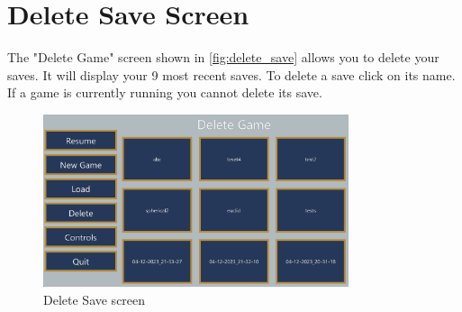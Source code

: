 \section{Delete Save Screen} \label{delete_save_screen}
The "Delete Game" screen shown in \autoref{fig:delete_save} allows you to delete your saves.
It will display your 9 most recent saves.
To delete a save click on its name.
If a game is currently running you cannot delete its save.

\begin{figure}[H]
    \centering
    \includegraphics[width=0.8\textwidth]{chapters/user_manual/resources/delete-game.png}
    \caption{Delete Save screen}
    \label{fig:delete_save}
\end{figure}